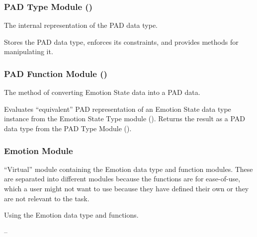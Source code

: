 \subsubsection{PAD Type Module ()}

\begin{description}[font=\scshape]
    \item[Secrets:] The internal representation of the PAD data type.

    \item[Services:] Stores the PAD data type, enforces its constraints, and
    provides methods for manipulating it.

    \item[Implemented By:] \progname{}
\end{description}

\subsubsection{PAD Function Module ()}

\begin{description}[font=\scshape]
    \item[Secrets:] The method of converting Emotion State data into a PAD data.

    \item[Services:] Evaluates ``equivalent'' PAD representation of an Emotion
    State data type instance from the Emotion State Type module
    (). Returns the result as a PAD data type from the PAD
    Type Module ().

    \item[Implemented By:] \progname{}
\end{description}

\subsubsection{Emotion Module}

\begin{description}[font=\scshape]
    \item[Secrets:] ``Virtual'' module containing the Emotion data type and
    function modules. These are separated into different modules because the
    functions are for ease-of-use, which a user might not want to use because
    they have defined their own or they are not relevant to the task.

    \item[Services:] Using the Emotion data type and functions.

    \item[Implemented By:] --
\end{description}

